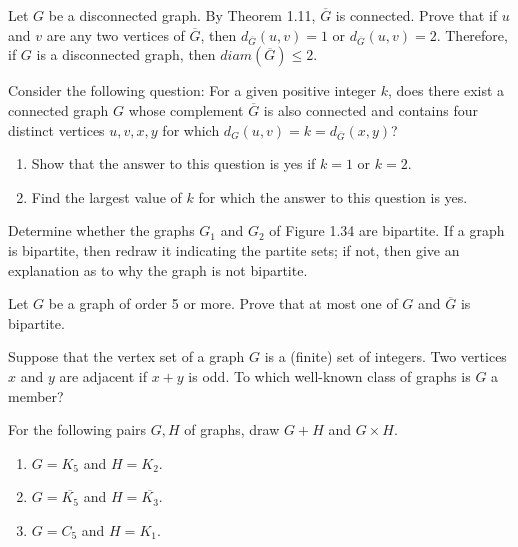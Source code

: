 \begin{exer}
Let $G$ be a disconnected graph. By Theorem 1.11, $\overline{G}$ is connected. Prove that if $u$ and $v$ are any two vertices of $\overline{G}$, then $d_{\overline{G}}(u,v)=1$ or $d_{\overline{G}}(u,v)=2$. Therefore, if $G$ is a disconnected graph, then $diam(\overline{G}) \leq 2$.
\end{exer}

\begin{exer}
Consider the following question: For a given positive integer $k$, does there exist a connected graph $G$ whose complement $\overline{G}$ is also connected and contains four distinct vertices $u,v,x,y$ for which $d_{G}(u,v)=k=d_{\overline{G}}(x,y)$?
\begin{enumerate}[{(a)}]
\item Show that the answer to this question is yes if $k=1$ or $k=2$.
\item Find the largest value of $k$ for which the answer to this question is yes.
\end{enumerate}
\end{exer}

\begin{exer}


Determine whether the graphs $G_{1}$ and $G_{2}$ of Figure 1.34 are bipartite. If a graph is bipartite, then redraw it indicating the partite sets; if not, then give an explanation as to why the graph is not bipartite.
\end{exer}

\begin{exer}
Let $G$ be a graph of order 5 or more. Prove that at most one of $G$ and $\overline{G}$ is bipartite.
\end{exer}

\begin{exer}
Suppose that the vertex set of a graph $G$ is a (finite) set of integers. Two vertices $x$ and $y$ are adjacent if $x+y$ is odd. To which well-known class of graphs is $G$ a member?
\end{exer}

\begin{exer}
For the following pairs $G,H$ of graphs, draw $G+H$ and $G \times H$.
\begin{enumerate}[{(a)}]
\item $G=K_{5}$ and $H=K_{2}$.
\item $G=\overline{K_{5}}$ and $H=\overline{K_{3}}$.
\item $G=C_{5}$ and $H=K_{1}$.
\end{enumerate}
\end{exer}

